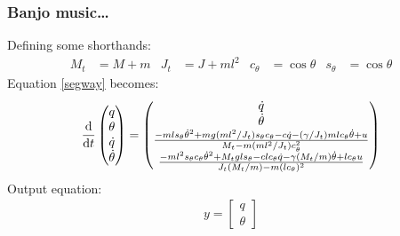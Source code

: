 \documentclass{beamer-control}
\begin{document}
\begin{frame}
\frametitle{Banjo music\dots}
Defining some shorthands:
\begin{align}
M_t &= M+m & J_t&=J+ml^2 & c_\theta&=\cos\theta & s_\theta &= \cos\theta
\end{align}
Equation \eqref{segway} becomes:
\begin{equation}
\frac{\mathrm{d} }{\mathrm{d} t}
\begin{pmatrix}
q \\
\theta \\
\dot{q} \\
\dot{\theta}
\end{pmatrix}
=
\begin{pmatrix}
\dot{q} \\
\dot{\theta} \\
\frac{-ml s_\theta \dot{\theta}^2 + mg(ml^2/J_t) s_\theta c_\theta - c \dot{q} - (\gamma/J_t) ml c_\theta \dot{\theta} + u}
{M_t - m(ml^2/J_t) c_\theta^2} \\
\frac{-ml^2 s_\theta c_\theta \dot{\theta}^2 + M_t gl s_\theta - cl c_\theta \dot{q} - \gamma(M_t/m) \dot{\theta} + lc_\theta u}
{J_t (M_t/m) - m(lc_\theta)^2}
\end{pmatrix}
\end{equation}
Output equation:
\begin{align}
y = \begin{bmatrix}
q\\\theta
\end{bmatrix}
\end{align}

\end{frame}
\end{document}
